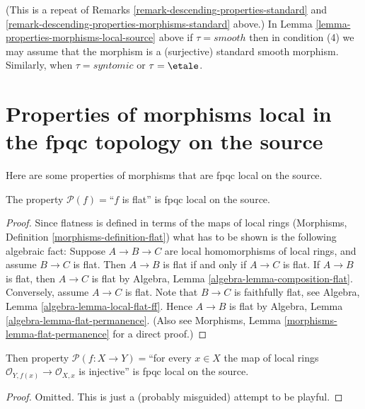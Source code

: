 \begin{remark}
\label{remark-properties-morphisms-local-source-standard}
(This is a repeat of
Remarks \ref{remark-descending-properties-standard}
and \ref{remark-descending-properties-morphisms-standard} above.)
In Lemma \ref{lemma-properties-morphisms-local-source} above if
$\tau = smooth$ then in condition (4) we may assume that
the morphism is a (surjective) standard smooth morphism.
Similarly, when $\tau = syntomic$ or $\tau = \etale$.
\end{remark}



\section{Properties of morphisms local in the fpqc topology on the source}
\label{section-fpqc-local-source}

\noindent
Here are some properties of morphisms that are fpqc local on the source.

\begin{lemma}
\label{lemma-flat-fpqc-local-source}
The property $\mathcal{P}(f)=$``$f$ is flat'' is fpqc local on the source.
\end{lemma}

\begin{proof}
Since flatness is defined in terms of the maps of local rings
(Morphisms, Definition \ref{morphisms-definition-flat})
what has to be shown is the following
algebraic fact: Suppose $A \to B \to C$ are local homomorphisms of local
rings, and assume $B \to C$ is flat. Then $A \to B$ is
flat if and only if $A \to C$ is flat.
If $A \to B$ is flat, then $A \to C$ is flat by
Algebra, Lemma \ref{algebra-lemma-composition-flat}.
Conversely, assume $A \to C$ is flat.
Note that $B \to C$ is faithfully
flat, see
Algebra, Lemma \ref{algebra-lemma-local-flat-ff}.
Hence $A \to B$ is flat by
Algebra, Lemma \ref{algebra-lemma-flat-permanence}.
(Also see Morphisms, Lemma \ref{morphisms-lemma-flat-permanence}
for a direct proof.)
\end{proof}

\begin{lemma}
\label{lemma-injective-local-rings-fpqc-local-source}
Then property
$\mathcal{P}(f : X \to Y)=$``for every $x \in X$ the map of local
rings $\mathcal{O}_{Y, f(x)} \to \mathcal{O}_{X, x}$ is injective''
is fpqc local on the source.
\end{lemma}

\begin{proof}
Omitted. This is just a (probably misguided) attempt to be playful.
\end{proof}





